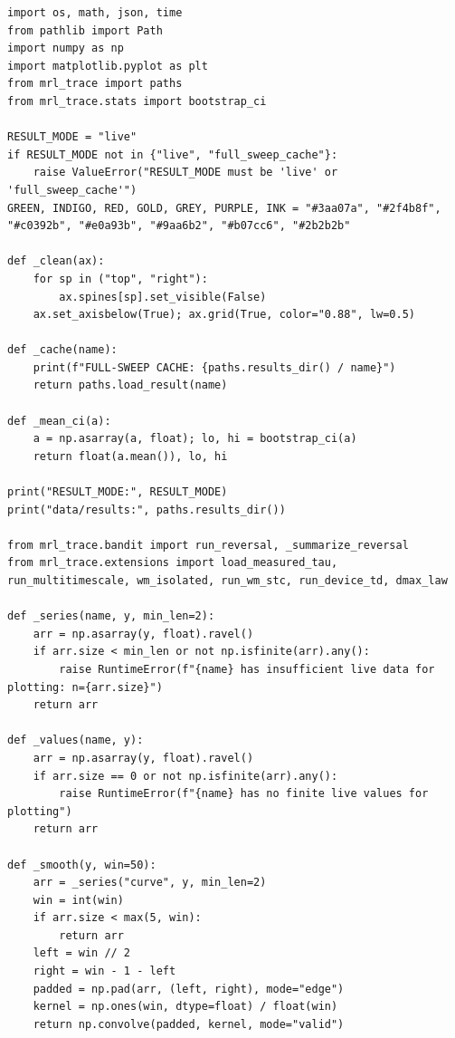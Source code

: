 \begin{lstlisting}[caption={06\_extensions.ipynb code cell 1},label={lst:mrl-nb-06-extensions-1}]
import os, math, json, time
from pathlib import Path
import numpy as np
import matplotlib.pyplot as plt
from mrl_trace import paths
from mrl_trace.stats import bootstrap_ci

RESULT_MODE = "live"
if RESULT_MODE not in {"live", "full_sweep_cache"}:
    raise ValueError("RESULT_MODE must be 'live' or 'full_sweep_cache'")
GREEN, INDIGO, RED, GOLD, GREY, PURPLE, INK = "#3aa07a", "#2f4b8f", "#c0392b", "#e0a93b", "#9aa6b2", "#b07cc6", "#2b2b2b"

def _clean(ax):
    for sp in ("top", "right"):
        ax.spines[sp].set_visible(False)
    ax.set_axisbelow(True); ax.grid(True, color="0.88", lw=0.5)

def _cache(name):
    print(f"FULL-SWEEP CACHE: {paths.results_dir() / name}")
    return paths.load_result(name)

def _mean_ci(a):
    a = np.asarray(a, float); lo, hi = bootstrap_ci(a)
    return float(a.mean()), lo, hi

print("RESULT_MODE:", RESULT_MODE)
print("data/results:", paths.results_dir())

from mrl_trace.bandit import run_reversal, _summarize_reversal
from mrl_trace.extensions import load_measured_tau, run_multitimescale, wm_isolated, run_wm_stc, run_device_td, dmax_law

def _series(name, y, min_len=2):
    arr = np.asarray(y, float).ravel()
    if arr.size < min_len or not np.isfinite(arr).any():
        raise RuntimeError(f"{name} has insufficient live data for plotting: n={arr.size}")
    return arr

def _values(name, y):
    arr = np.asarray(y, float).ravel()
    if arr.size == 0 or not np.isfinite(arr).any():
        raise RuntimeError(f"{name} has no finite live values for plotting")
    return arr

def _smooth(y, win=50):
    arr = _series("curve", y, min_len=2)
    win = int(win)
    if arr.size < max(5, win):
        return arr
    left = win // 2
    right = win - 1 - left
    padded = np.pad(arr, (left, right), mode="edge")
    kernel = np.ones(win, dtype=float) / float(win)
    return np.convolve(padded, kernel, mode="valid")
\end{lstlisting}

